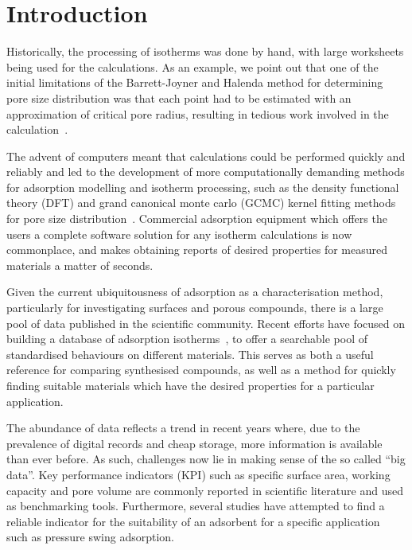 
\section{Introduction}

Historically, the processing of isotherms was done by hand, with large
worksheets being used for the calculations. As an example,
we point out that one of the initial limitations of the
Barrett-Joyner and Halenda method for determining pore size distribution
was that each point had to be estimated with an approximation of critical
pore radius, resulting in tedious work involved in the
calculation~\cite{barrettDeterminationPoreVolume1951}.

The advent of computers meant that calculations could be performed
quickly and reliably and led to the development of more computationally
demanding methods for adsorption modelling and isotherm processing, such as the 
density functional theory (DFT) and grand canonical monte carlo (GCMC) kernel fitting
methods for pore size distribution~\cite{seatonNewAnalysisMethod1989,%
	tarazonaPhaseEquilibriaFluid1987}.
Commercial adsorption equipment which offers the users
a complete software solution for any isotherm calculations is now
commonplace, and makes obtaining reports of desired properties
for measured materials a matter of seconds.

Given the current ubiquitousness of adsorption as a characterisation method,
particularly for investigating surfaces and porous compounds,
there is a large pool of data published in the scientific community.
Recent efforts have focused on building a database of adsorption
isotherms~\cite{sideriusNISTARPAEDatabase2015}, to offer a searchable
pool of standardised behaviours on different materials. This serves as
both a useful reference for comparing synthesised compounds, as well as a
method for quickly finding suitable materials which have the
desired properties for a particular application.

The abundance of data reflects a trend in recent years where, due
to the prevalence of digital records and cheap storage, more
information is available than ever before. As such, challenges
now lie in making sense of the so called ``big data''.
Key performance indicators (KPI) such as specific surface area, working
capacity and pore volume are commonly reported in scientific literature
and used as benchmarking tools. Furthermore,
several studies have attempted to find a reliable indicator for
the suitability of an adsorbent for a specific
application~\cite{regeSimpleParameterSelecting2001, %
	ackley2000psa,%
	wiersumAdsorbentPerformanceIndicator2013} such as pressure swing
adsorption.

